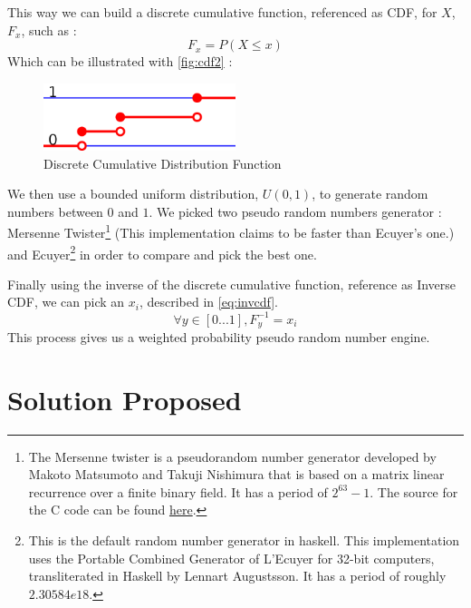 \documentclass[12pt,a4paper,titlepage]{article}
\begin{document}
This way we can build a discrete cumulative function, referenced as CDF,
 for $X$, $F_x$, such as :
\begin{equation}
	F_x = P\left( X \leq x \right)
	\label{eq:cdf}
\end{equation}
Which can be illustrated with \autoref{fig:cdf2} :
\begin{figure}[h!]
\begin{center}
\includegraphics[width=0.5\textwidth]{img/cdf.png}
\caption{Discrete Cumulative Distribution Function}
\label{fig:cdf2}
\end{center}
\end{figure}

We then use a bounded uniform distribution, $U\left(0,1\right)$,
to generate random numbers between $0$ and $1$.
We picked two pseudo random numbers generator : Mersenne Twister\footnote{
The Mersenne twister is a pseudorandom number generator developed by 
Makoto Matsumoto and Takuji Nishimura that is based on a matrix linear 
recurrence over a finite binary field. 
It has a period of $2^{63}-1$.
The source for the C code can be found 
\href{http://www.math.sci.hiroshima-u.ac.jp/~m-mat/MT/emt64.html}{here}.
} (This implementation claims to be faster than Ecuyer's one.) and Ecuyer\footnote{
This is the default random number generator in haskell.
 This implementation uses the Portable Combined Generator of L'Ecuyer
 for 32-bit computers, transliterated in Haskell by Lennart Augustsson. 
 It has a period of roughly $2.30584e18$.
 } in order to compare and pick the best one.

Finally using the inverse of the discrete cumulative function, reference as Inverse CDF, 
we can pick an $x_i$, described in \autoref{eq:invcdf}.
\begin{equation}
	\forall y \in \left[0...1 \right], F^{-1}_y = x_i
	\label{eq:invcdf}
\end{equation}
This process gives us a weighted probability pseudo random number engine.

\newpage
\section{Solution Proposed}
\end{document}
